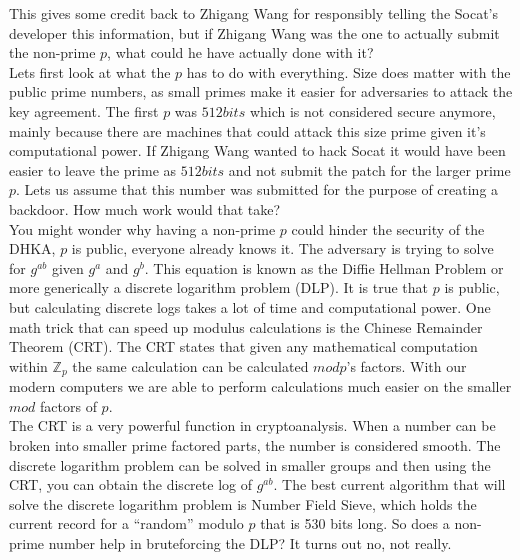 \documentclass[letterpaper,11pt,notitlepage,fleqn]{article}
\begin{document}
This gives some credit back to Zhigang Wang for responsibly telling the Socat's developer this information, but if Zhigang Wang was the one to actually submit the non-prime $p$, what could he have actually done with it?
\\
\indent Lets first look at what the $p$ has to do with everything. Size does matter with the public prime numbers, as small primes make it easier for adversaries to attack the key agreement. The first $p$ was $512 bits$ which is not considered secure anymore, mainly because there are machines that could attack this size prime given it's computational power. If Zhigang Wang wanted to hack Socat it would have been easier to leave the prime as $512bits$ and not submit the patch for the larger prime $p$. Lets us assume that this
number was submitted for the purpose of creating a backdoor. How much work would that take?
\\
\indent You might wonder why having a non-prime $p$ could hinder the security of the DHKA, $p$ is public, everyone already knows it. The adversary is trying to solve for $g^{ab}$ given $g^a$ and $g^b$. This equation is known as the Diffie Hellman Problem or more generically a discrete logarithm problem (DLP). It is true that $p$ is public, but calculating discrete logs takes a lot of time and computational power.  One math trick that can speed
up modulus calculations is the Chinese Remainder Theorem (CRT). The CRT states that given any mathematical computation within $\mathbb{Z}_{p}$ the same calculation can be calculated $mod p$'s factors. With our modern computers we are able to perform calculations much easier on the smaller $mod$ factors of $p$.
\\
\indent The CRT is a very powerful function in cryptoanalysis. When a number can be broken into smaller prime factored parts, the number is considered smooth. The discrete logarithm problem can be solved in smaller groups and then using the CRT, you can obtain the discrete log of $g^{ab}$. The best current algorithm that will solve the discrete logarithm problem is Number Field Sieve, which holds the current record for a “random” modulo $p$ that is 530 bits long. So does a non-prime number help
in bruteforcing the DLP? It turns out no, not really.
\end{document}
